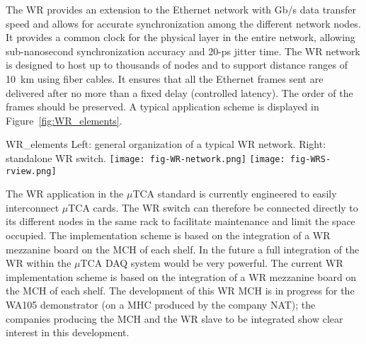 The WR provides an extension to the Ethernet network with Gb/s data
transfer speed and allows for accurate synchronization among the different
network nodes. 
It provides a common clock for the physical layer in the entire
network, allowing sub-nanosecond synchronization accuracy and 20-ps
jitter time. The WR network is designed to host up to thousands of
nodes and to support distance ranges of 10~km using fiber cables. It
ensures that all the Ethernet frames sent are delivered
after no more than a fixed delay  (controlled latency). The order of the frames should be
preserved.  A typical application scheme is displayed
in Figure~\ref{fig:WR_elements}.
\begin{cdrfigure}{WR_elements}
{\small Left: general organization of a typical WR network. Right: standalone WR switch.}
\texttt{[image: fig-WR-network.png]}
\texttt{[image: fig-WRS-rview.png]}
\end{cdrfigure}

The WR application in the $\mu$TCA standard is currently engineered 
to easily interconnect $\mu$TCA cards.  The WR  switch
can therefore be connected directly to its different nodes in the same
rack to facilitate 
maintenance and limit the space occupied. 
The implementation scheme is based on the integration of a WR mezzanine board on the MCH
of each shelf. 
In the future  a full integration of the WR within the $\mu$TCA DAQ system would be very powerful. 
The current WR implementation scheme is based on the integration of a WR mezzanine board on the MCH of each shelf. 
The development of this WR MCH is in progress for the WA105
demonstrator (on a MHC produced by the company NAT); the companies
producing the MCH and the WR slave to be integrated show clear interest in this development.